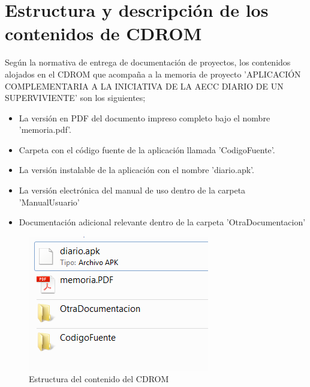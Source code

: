 \documentclass[../pfc.tex]{subfiles}
\begin{document}
	
	\section*{Estructura y descripción de los contenidos de CDROM}
	
	Según la normativa de entrega de documentación de proyectos, los contenidos alojados en el CDROM que acompaña a la memoria de proyecto 'APLICACIÓN COMPLEMENTARIA A LA INICIATIVA DE LA AECC DIARIO DE UN SUPERVIVIENTE' son los siguientes;
	
	\begin{itemize}
		\item La versión en PDF del documento impreso completo bajo el nombre 'memoria.pdf'.
		\item Carpeta con el código fuente de la aplicación llamada 'CodigoFuente'.
		\item La versión instalable de la aplicación con el nombre 'diario.apk'.
		\item La versión electrónica del manual de uso dentro de la carpeta 'ManualUsuario'
		\item Documentación adicional relevante dentro de la carpeta 'OtraDocumentacion'
	\end{itemize}
	
	\begin{figure}[H]
		\centering
		\includegraphics[width=0.6\linewidth]{../images/doc_cd}
		\caption{Estructura del contenido del CDROM}
		\label{fig:cleanarch}
	\end{figure}
	
\end{document}
